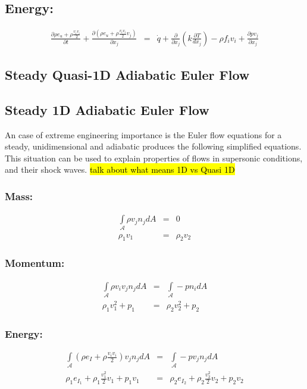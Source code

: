 \subsection*{Energy:}
\begin{eqnarray}
\frac{\partial \rho e_u+ \rho\frac{v_i v_i}{2}}{\partial t} +  \frac{\partial (\rho e_u + \rho\frac{v_i v_i}{2} v_j)}{\partial x_j} &=&  \dot{q} + \frac{\partial} {\partial x_j} \left( k\frac{\partial T}{d x_j} \right) - \rho f_i v_i  + \frac{\partial  p v_j }{\partial x_j}
\end{eqnarray}


\subsection{Steady Quasi-1D Adiabatic Euler Flow}




\subsection{Steady 1D Adiabatic Euler Flow}
\label{1d_adiabatic_inviscid}
An case of extreme engineering importance is the Euler flow equations for a steady, unidimensional and adiabatic produces the following simplified equations.
This situation can be used to explain properties of flows in supersonic conditions, and their shock waves.
\hl{talk about what means 1D vs Quasi 1D}
\subsubsection*{Mass:}
 \begin{eqnarray}
    \int\limits_{\mathcal{A}} \rho v_j n_j dA &=& 0 \\
    \rho_1 v_1  &=&\rho_2 v_2
\end{eqnarray}


\subsubsection*{Momentum:}
\begin{eqnarray}
    \int\limits_{\mathcal{A}} \rho v_i v_j n_j dA &=& \int\limits_{\mathcal{A}} - p n_i dA \\
    \rho_1 v^2_1 + p_1&=&  \rho_2 v^2_2 + p_2
\end{eqnarray}

\subsubsection*{Energy:}
\begin{eqnarray}
     \int\limits_{\mathcal{A}} (\rho e_I + \rho\frac{v_i v_i}{2}) v_j n_j dA &=& \int\limits_{\mathcal{A}} - p v_j n_j dA \\
     \rho_1 e_{I_1} + \rho_1\frac{v^2_1 }{2} v_1  + p_1 v_1 &=& \rho_2 e_{I_2} + \rho_2\frac{v^2_2 }{2} v_2 +  p_2 v_2
\end{eqnarray}

